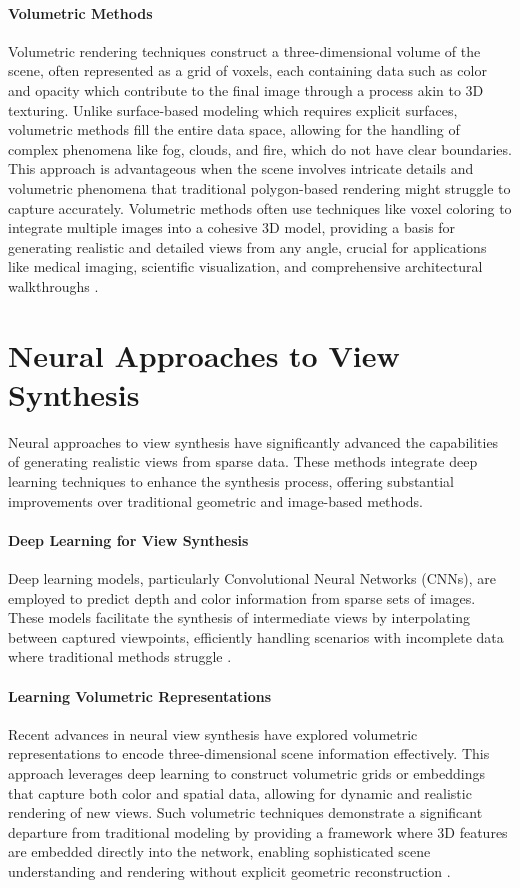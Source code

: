 \paragraph{Volumetric Methods}
Volumetric rendering techniques construct a three-dimensional volume of the scene, often represented as a grid of voxels, each containing data such as color and opacity which contribute to the final image through a process akin to 3D texturing.
Unlike surface-based modeling which requires explicit surfaces, volumetric methods fill the entire data space, allowing for the handling of complex phenomena like fog, clouds, and fire, which do not have clear boundaries.
This approach is advantageous when the scene involves intricate details and volumetric phenomena that traditional polygon-based rendering might struggle to capture accurately.
Volumetric methods often use techniques like voxel coloring to integrate multiple images into a cohesive 3D model, providing a basis for generating realistic and detailed views from any angle, crucial for applications like medical imaging, scientific visualization, and comprehensive architectural walkthroughs \cite{curless_volumetric_1996,seitz_photorealistic_1999}.

\section{Neural Approaches to View Synthesis}
Neural approaches to view synthesis have significantly advanced the capabilities of generating realistic views from sparse data.
These methods integrate deep learning techniques to enhance the synthesis process, offering substantial improvements over traditional geometric and image-based methods.

\paragraph{Deep Learning for View Synthesis}
Deep learning models, particularly Convolutional Neural Networks (CNNs), are employed to predict depth and color information from sparse sets of images.
These models facilitate the synthesis of intermediate views by interpolating between captured viewpoints, efficiently handling scenarios with incomplete data where traditional methods struggle \cite{kalantari_learning-based_2016,maxim_tatarchenko_single-view_2015,peter_hedman_deep_2019}.

\paragraph{Learning Volumetric Representations}
Recent advances in neural view synthesis have explored volumetric representations to encode three-dimensional scene information effectively.
This approach leverages deep learning to construct volumetric grids or embeddings that capture both color and spatial data, allowing for dynamic and realistic rendering of new views.
Such volumetric techniques demonstrate a significant departure from traditional modeling by providing a framework where 3D features are embedded directly into the network, enabling sophisticated scene understanding and rendering without explicit geometric reconstruction \cite{lombardi_neural_2019,sitzmann_deepvoxels_2019}.

